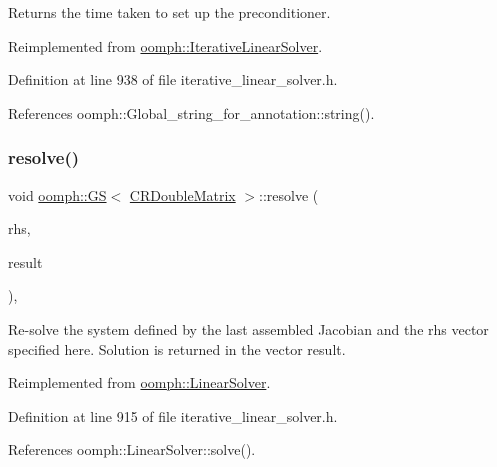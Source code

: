 Returns the time taken to set up the preconditioner. 



Reimplemented from \hyperlink{classoomph_1_1IterativeLinearSolver_a87eb959944a3e8efa467d60aed43a0d3}{oomph\+::\+Iterative\+Linear\+Solver}.



Definition at line 938 of file iterative\+\_\+linear\+\_\+solver.\+h.



References oomph\+::\+Global\+\_\+string\+\_\+for\+\_\+annotation\+::string().

\mbox{\label{classoomph_1_1GS_3_01CRDoubleMatrix_01_4_ae03a5216cba7878a728bda9186be5d15}} 
\subsubsection{\texorpdfstring{resolve()}{resolve()}}
{\footnotesize\ttfamily void \hyperlink{classoomph_1_1GS}{oomph\+::\+GS}$<$ \hyperlink{classoomph_1_1CRDoubleMatrix}{C\+R\+Double\+Matrix} $>$\+::resolve (\begin{DoxyParamCaption}\item[{const \hyperlink{classoomph_1_1DoubleVector}{Double\+Vector} \&}]{rhs,  }\item[{\hyperlink{classoomph_1_1DoubleVector}{Double\+Vector} \&}]{result }\end{DoxyParamCaption})\hspace{0.3cm}{\ttfamily [inline]}, {\ttfamily [virtual]}}



Re-\/solve the system defined by the last assembled Jacobian and the rhs vector specified here. Solution is returned in the vector result. 



Reimplemented from \hyperlink{classoomph_1_1LinearSolver_a3b310d08333033edc119b2a5bd7dcbfb}{oomph\+::\+Linear\+Solver}.



Definition at line 915 of file iterative\+\_\+linear\+\_\+solver.\+h.



References oomph\+::\+Linear\+Solver\+::solve().

